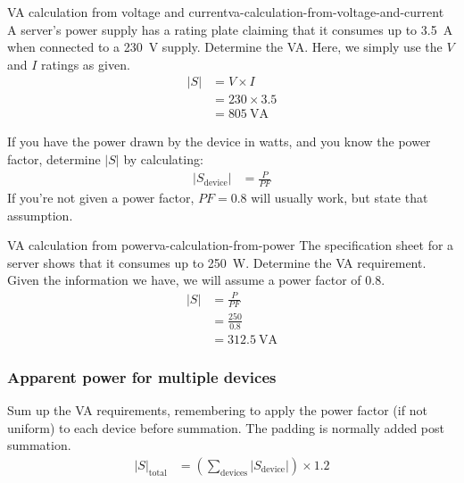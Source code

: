 \documentclass{pgnotes}
\begin{document}
\begin{example}{VA calculation from voltage and current}{va-calculation-from-voltage-and-current}
  A server's power supply has a rating plate claiming that it consumes up to \SI{3.5}{\ampere} when connected to a \SI{230}{\volt} supply.
  Determine the VA.
  \tcblower
  Here, we simply use the $V$ and $I$ ratings as given.
  \begin{align}
    \left \lvert S \right \rvert & = V \times I \\
                                 & = 230 \times 3.5 \\
                                 & = \SI{805}{\volt\ampere}
  \end{align}
\end{example}


If you have the power drawn by the device in watts, and you know the power factor, determine $\left \lvert S \right \rvert$ by calculating:
\begin{align}
   \left \lvert S_{\mbox{device}} \right \rvert & = \frac{P}{PF }
\end{align}
If you're not given a power factor, $PF = 0.8$ will usually work, but state that assumption.

\begin{example}{VA calculation from power}{va-calculation-from-power}
  The specification sheet for a server shows that it consumes up to \SI{250}{\watt}.
  Determine the VA requirement.
  \tcblower
  Given the information we have, we will assume a power factor of 0.8.
  \begin{align}
    \left \lvert S \right \rvert & = \frac{P}{PF} \\
                                 & = \frac{250}{0.8} \\
                                 & = \SI{312.5}{\volt\ampere}
  \end{align}
\end{example}


\subsubsection{Apparent power for multiple devices}

Sum up the VA requirements, remembering to apply the power factor (if not uniform) to each device before summation.
The padding is normally added post summation. 
\begin{align}
  \left \lvert S \right \rvert _{\mbox{total}} & = \left ( \sum_{\mbox{devices}} \left \lvert S_{\mbox{device}} \right \rvert \right ) \times 1.2
\end{align}
\end{document}
